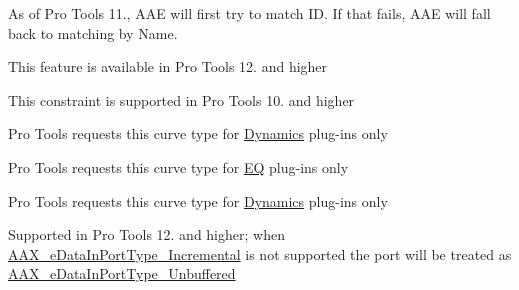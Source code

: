 \begin{DoxyRefList}
As of Pro Tools 11., AAE will first try to match ID. If that fails, AAE will fall back to matching by Name. 
\item[Module \mbox{\hyperlink{a00932}{AAX\+\_\+\+Digi\+Trace\+\_\+\+Guide}} ]\label{a00879__compatibility_notes000008}%
%
 This feature is available in Pro Tools 12. and higher 
\item[Member \mbox{\hyperlink{a00524_a0c5d795c1fd021c5b9b541febc34601aa0bcc93a22d3477c447eb751514e8fa94}{AAX\+\_\+e\+Constraint\+Location\+Mask\+\_\+\+DLLChip\+Affinity}} ]\label{a00879__compatibility_notes000044}%
%
 This constraint is supported in Pro Tools 10. and higher  
\item[Member \mbox{\hyperlink{a00901_gga59c73d8f51c5c55d54a728eff39da884aed3949ae429e38e979f7d005759c579e}{AAX\+\_\+e\+Curve\+Type\+\_\+\+Dynamics}} ]\label{a00879__compatibility_notes000023}%
%
 Pro Tools requests this curve type for \mbox{\hyperlink{a00524_aef9637518fb1ac0e2f403444c73aba4aa1e8d5202983c58aa0346a9a547f55bd9}{Dynamics}} plug-\/ins only  
\item[Member \mbox{\hyperlink{a00901_gga59c73d8f51c5c55d54a728eff39da884a01b32d7031ceff45f7acad05dcddad19}{AAX\+\_\+e\+Curve\+Type\+\_\+\+EQ}} ]\label{a00879__compatibility_notes000022}%
%
 Pro Tools requests this curve type for \mbox{\hyperlink{a00524_aef9637518fb1ac0e2f403444c73aba4aad84edabff7d1d8732079b467c07dedcc}{EQ}} plug-\/ins only  
\item[Member \mbox{\hyperlink{a00901_gga59c73d8f51c5c55d54a728eff39da884a011b1b00d6189a8903735dcae2f8bc93}{AAX\+\_\+e\+Curve\+Type\+\_\+\+Reduction}} ]\label{a00879__compatibility_notes000024}%
%
 Pro Tools requests this curve type for \mbox{\hyperlink{a00524_aef9637518fb1ac0e2f403444c73aba4aa1e8d5202983c58aa0346a9a547f55bd9}{Dynamics}} plug-\/ins only  
\item[Member \mbox{\hyperlink{a00524_ab5677b173ad8647c24d34d28272d11fca4c356b21e878cfafca33ff61e1044b2e}{AAX\+\_\+e\+Data\+In\+Port\+Type\+\_\+\+Incremental}} ]\label{a00879__compatibility_notes000045}%
%
 Supported in Pro Tools 12. and higher; when \mbox{\hyperlink{a00524_ab5677b173ad8647c24d34d28272d11fca4c356b21e878cfafca33ff61e1044b2e}{AAX\+\_\+e\+Data\+In\+Port\+Type\+\_\+\+Incremental}} is not supported the port will be treated as \mbox{\hyperlink{a00524_ab5677b173ad8647c24d34d28272d11fca43dc59a68b369ee607f70700bfd02c2d}{AAX\+\_\+e\+Data\+In\+Port\+Type\+\_\+\+Unbuffered}}  

\end{DoxyRefList}
